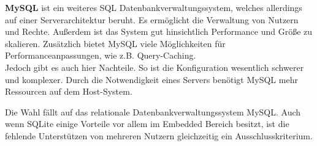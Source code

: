 \textbf{MySQL} ist ein weiteres \ac{SQL} Datenbankverwaltungssystem, welches allerdings auf einer Serverarchitektur beruht. 
Es ermöglicht die Verwaltung von Nutzern und Rechte. Außerdem ist das System gut hinsichtlich Performance und Größe zu skalieren. Zusätzlich bietet MySQL viele Möglichkeiten für Performanceanpassungen, wie z.B. Query-Caching.
\\
Jedoch gibt es auch hier Nachteile. So ist die Konfiguration wesentlich schwerer und komplexer. Durch die Notwendigkeit eines Servers benötigt MySQL mehr Ressourcen auf dem Host-System.

Die Wahl fällt auf das relationale Datenbankverwaltungssystem MySQL. Auch wenn SQLite einige Vorteile vor allem im Embedded Bereich besitzt, ist die fehlende Unterstützen von mehreren Nutzern gleichzeitig ein Ausschlusskriterium.

\cite{saake2010datenbanken}


